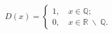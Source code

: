 \documentclass[preview]{standalone}
\begin{document}
\begin{align*}
D(x)=\begin{cases} 1, \quad x \in \mathbb{Q}; \\0, \quad x \in  \mathbb{R} \ \backslash \ \mathbb{Q}. \end{cases}
\end{align*}
\end{document}
